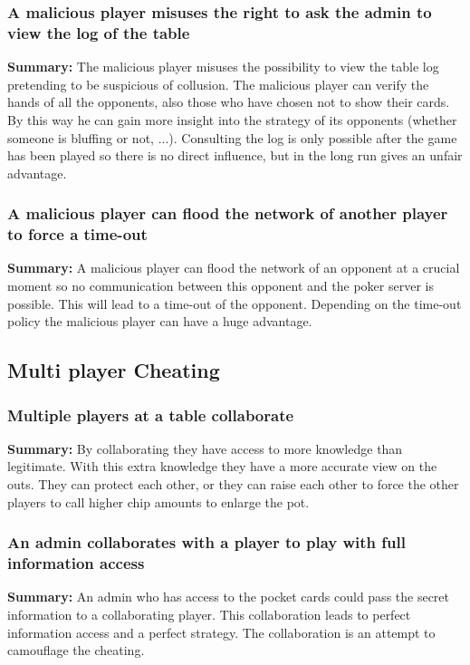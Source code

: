 \documentclass[a4paper,11pt]{report}
\begin{document}
\subsubsection{A malicious player misuses the right to ask the admin to view the log of the table}
\textbf{Summary:} The malicious player misuses the possibility to view the table log pretending to be suspicious of collusion. The malicious player can verify the hands of all the opponents, also those who have chosen not to show their cards. By this way he can gain more insight into the strategy of its opponents (whether someone is bluffing or not, ...). Consulting the log is only possible after the game has been played so there is no direct influence, but in the long run gives an unfair advantage.
\subsubsection{A malicious player can flood the network of another player to force a time-out}
\textbf{Summary:} A malicious player can flood the network of an opponent at a crucial moment so no communication between this opponent and the poker server is possible. This will lead to a time-out of the opponent. Depending on the time-out policy the malicious player can have a huge advantage.
\subsection{Multi player Cheating}
\subsubsection{Multiple players at a table collaborate}
\textbf{Summary:} By collaborating they have access to more knowledge than legitimate. With this extra knowledge they have a more accurate view on the outs. They can protect each other, or they can raise each other to force the other players to call higher chip amounts to enlarge the pot.
\subsubsection{An admin collaborates with a player to play with full information access}
\textbf{Summary:} An admin who has access to the pocket cards could pass the secret information to a collaborating player. This collaboration leads to perfect information access and a perfect strategy. The collaboration is an attempt to camouflage the cheating.
\end{document}
